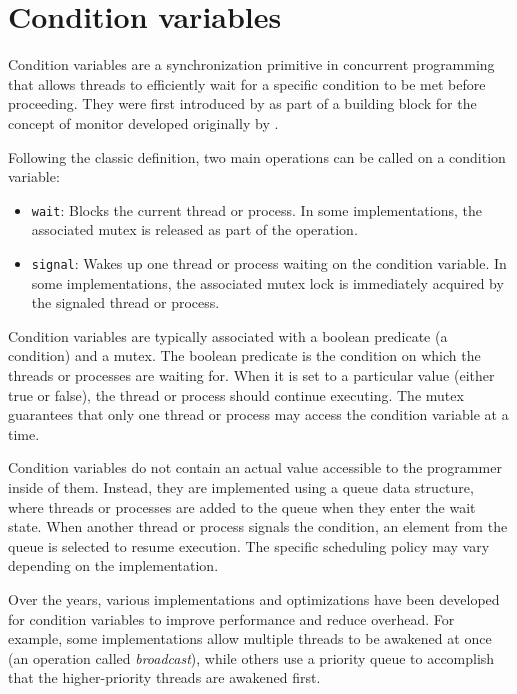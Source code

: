 \section{Condition variables}
\label{sec:condition-variables}

Condition variables are a synchronization primitive in concurrent programming
that allows threads to efficiently wait
for a specific condition to be met before proceeding.
They were first introduced by \cite{hoare1974monitors}
as part of a building block for the concept of monitor developed
originally by \cite{hansen1973operating}.

Following the classic definition, two main operations
can be called on a condition variable:

\begin{itemize}
      \item \texttt{wait}: Blocks the current thread or process.
            In some implementations, the associated mutex
            is released as part of the operation.
      \item \texttt{signal}: Wakes up one thread or process
            waiting on the condition variable.
            In some implementations, the associated mutex lock is immediately
            acquired by the signaled thread or process.
\end{itemize}

Condition variables are typically associated
with a boolean predicate (a condition) and a mutex.
The boolean predicate is the condition
on which the threads or processes are waiting for.
When it is set to a particular value (either true or false),
the thread or process should continue executing.
The mutex guarantees that only one thread or process
may access the condition variable at a time.

Condition variables do not contain an actual value
accessible to the programmer inside of them.
Instead, they are implemented using a queue data structure, where
threads or processes are added to the queue when they enter the wait state.
When another thread or process signals the condition,
an element from the queue is selected to resume execution.
The specific scheduling policy may vary depending on the implementation.

Over the years, various implementations and optimizations have been developed
for condition variables to improve performance and reduce overhead.
For example, some implementations allow multiple threads to be awakened at once
(an operation called \emph{broadcast}),
while others use a priority queue
to accomplish that the higher-priority threads are awakened first.

